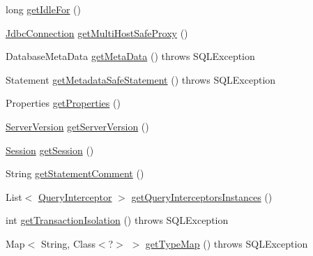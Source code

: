 \begin{DoxyCompactItemize}
\item 
long \mbox{\hyperlink{classcom_1_1mysql_1_1cj_1_1jdbc_1_1ha_1_1_multi_host_my_s_q_l_connection_a640187b96b3d091f9b74a927c754098c}{get\+Idle\+For}} ()
\item 
\mbox{\hyperlink{interfacecom_1_1mysql_1_1cj_1_1jdbc_1_1_jdbc_connection}{Jdbc\+Connection}} \mbox{\hyperlink{classcom_1_1mysql_1_1cj_1_1jdbc_1_1ha_1_1_multi_host_my_s_q_l_connection_a3ab2516b8f780cee30b02799846745e7}{get\+Multi\+Host\+Safe\+Proxy}} ()
\item 
Database\+Meta\+Data \mbox{\hyperlink{classcom_1_1mysql_1_1cj_1_1jdbc_1_1ha_1_1_multi_host_my_s_q_l_connection_a43aceadcc65d836e90179a00f8b7af6c}{get\+Meta\+Data}} ()  throws S\+Q\+L\+Exception 
\item 
Statement \mbox{\hyperlink{classcom_1_1mysql_1_1cj_1_1jdbc_1_1ha_1_1_multi_host_my_s_q_l_connection_a62f8f7a723023f9bcda91b16ea300a3c}{get\+Metadata\+Safe\+Statement}} ()  throws S\+Q\+L\+Exception 
\item 
Properties \mbox{\hyperlink{classcom_1_1mysql_1_1cj_1_1jdbc_1_1ha_1_1_multi_host_my_s_q_l_connection_a4a717cb95caa93ac7469d50383e2882b}{get\+Properties}} ()
\item 
\mbox{\hyperlink{classcom_1_1mysql_1_1cj_1_1_server_version}{Server\+Version}} \mbox{\hyperlink{classcom_1_1mysql_1_1cj_1_1jdbc_1_1ha_1_1_multi_host_my_s_q_l_connection_aa2b70298f4e5d40fc09d7134ac25f6e3}{get\+Server\+Version}} ()
\item 
\mbox{\hyperlink{interfacecom_1_1mysql_1_1cj_1_1_session}{Session}} \mbox{\hyperlink{classcom_1_1mysql_1_1cj_1_1jdbc_1_1ha_1_1_multi_host_my_s_q_l_connection_a656ba156c1e99bf0e9d0a2fd5c3cb646}{get\+Session}} ()
\item 
String \mbox{\hyperlink{classcom_1_1mysql_1_1cj_1_1jdbc_1_1ha_1_1_multi_host_my_s_q_l_connection_ae92114d9d277c58982679012dccd1017}{get\+Statement\+Comment}} ()
\item 
List$<$ \mbox{\hyperlink{interfacecom_1_1mysql_1_1cj_1_1interceptors_1_1_query_interceptor}{Query\+Interceptor}} $>$ \mbox{\hyperlink{classcom_1_1mysql_1_1cj_1_1jdbc_1_1ha_1_1_multi_host_my_s_q_l_connection_ab5bdebf96a1fc7125bc76560cf57d1bf}{get\+Query\+Interceptors\+Instances}} ()
\item 
int \mbox{\hyperlink{classcom_1_1mysql_1_1cj_1_1jdbc_1_1ha_1_1_multi_host_my_s_q_l_connection_aadcad9f3a3afcc4326191c01257736fe}{get\+Transaction\+Isolation}} ()  throws S\+Q\+L\+Exception 
\item 
Map$<$ String, Class$<$?$>$ $>$ \mbox{\hyperlink{classcom_1_1mysql_1_1cj_1_1jdbc_1_1ha_1_1_multi_host_my_s_q_l_connection_a58a733e4a7e82b8f7dd8b218f57dd0e8}{get\+Type\+Map}} ()  throws S\+Q\+L\+Exception 

\end{DoxyCompactItemize}
